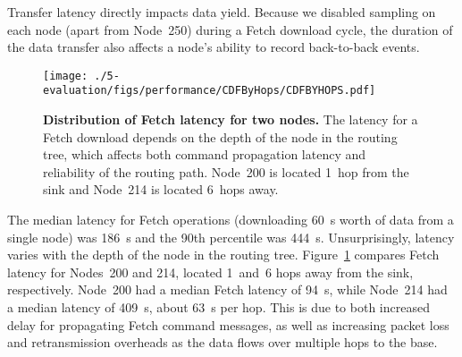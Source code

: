 Transfer latency directly impacts data yield. Because we disabled sampling on
each node (apart from Node~250) during a Fetch download cycle, the duration
of the data transfer also affects a node's ability to record back-to-back
events.

\begin{figure}[t]
\begin{center}
\texttt{[image: ./5-evaluation/figs/performance/CDFByHops/CDFBYHOPS.pdf]}
\end{center}
\caption{\textbf{Distribution of Fetch latency for two nodes.}
The latency for a Fetch download depends on the depth of the node in the
routing tree, which affects both command propagation latency and reliability
of the routing path. Node~200 is located 1~hop from the sink and Node~214 is
located 6~hops away.}
\label{evaluation-fig-fetchlatency-byhops}
\end{figure}

The median latency for Fetch operations (downloading 60~s worth of data from
a single node) was 186~s and the 90th percentile was 444~s. Unsurprisingly,
latency varies with the depth of the node in the routing tree.
Figure~\ref{evaluation-fig-fetchlatency-byhops} compares Fetch latency for
Nodes~200 and 214, located 1~and~6 hops away from the sink, respectively.
Node~200 had a median Fetch latency of 94~s, while Node~214 had a median
latency of 409~s, about 63~s per hop. This is due to both increased delay for
propagating Fetch command messages, as well as increasing packet loss and
retransmission overheads as the data flows over multiple hops to the base.
